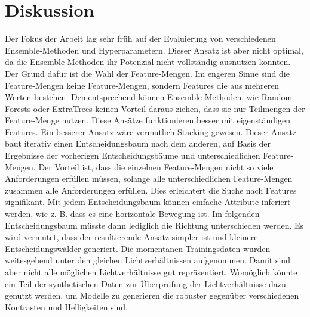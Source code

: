 \chapter{Diskussion}
Der Fokus der Arbeit lag sehr früh auf der Evaluierung von verschiedenen Ensemble-Methoden und Hyperparametern. Dieser Ansatz ist aber nicht optimal, da die Ensemble-Methoden ihr Potenzial nicht vollständig
ausnutzen konnten. Der Grund dafür ist die Wahl der Feature-Mengen. Im engeren Sinne sind die Feature-Mengen keine Feature-Mengen, sondern Features die aus mehreren Werten bestehen. Dementsprechend können
Ensemble-Methoden, wie Random Forests oder ExtraTrees keinen Vorteil daraus ziehen, dass sie nur Teilmengen der Feature-Menge nutzen. Diese Ansätze funktionieren besser mit eigenständigen Features.
\newline
\newline
Ein besserer Ansatz wäre vermutlich Stacking gewesen. Dieser Ansatz baut iterativ einen Entscheidungsbaum nach dem anderen, auf Basis der Ergebnisse der vorherigen Entscheidungsbäume und
unterschiedlichen Feature-Mengen. Der Vorteil ist, dass die einzelnen Feature-Mengen nicht so viele Anforderungen erfüllen müssen, solange alle unterschiedlichen Feature-Mengen zusammen alle
Anforderungen erfüllen. Dies erleichtert die Suche nach Features signifikant. Mit jedem Entscheidungsbaum können einfache Attribute inferiert werden, wie z. B. dass es eine horizontale Bewegung ist.
Im folgenden Entscheidungsbaum müsste dann lediglich die Richtung unterschieden werden. Es wird vermutet, dass der resultierende Ansatz simpler ist und kleinere Entscheidungswälder generiert.
\newline
\newline
Die momentanen Trainingsdaten wurden weitesgehend unter den gleichen Lichtverhältnissen aufgenommen. Damit sind aber nicht alle möglichen Lichtverhältnisse gut repräsentiert. Womöglich könnte ein
Teil der synthetischen Daten zur Überprüfung der Lichtverhältnisse dazu genutzt werden, um Modelle zu generieren die robuster gegenüber verschiedenen Kontrasten und Helligkeiten sind.